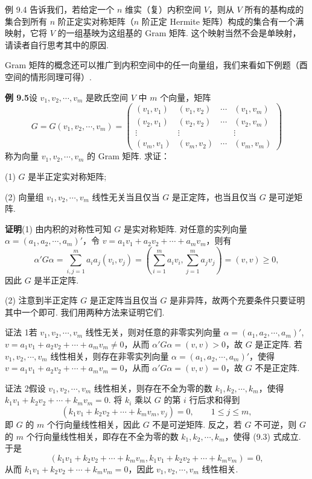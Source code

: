 \documentclass[UTF8,12pt,a4paper,fontset=fandol]{ctexart}
\begin{document}
例 9.4 告诉我们，若给定一个 $n$ 维实（复）内积空间 $V$，则从 $V$ 所有的基构成的集合到所有 $n$ 阶正定实对称矩阵（$n$ 阶正定 Hermite 矩阵）构成的集合有一个满映射，它将 $V$ 的一组基映为这组基的 Gram 矩阵. 这个映射当然不会是单映射，请读者自行思考其中的原因.

Gram 矩阵的概念还可以推广到内积空间中的任一向量组，我们来看如下例题（酉空间的情形同理可得）.

\noindent\textbf{例 9.5}\quad 设 $v_1,v_2,\cdots,v_m$ 是欧氏空间 $V$ 中 $m$ 个向量，矩阵
\[
G=G(v_1,v_2,\cdots,v_m)=
\begin{pmatrix}
(v_1,v_1)&(v_1,v_2)&\cdots&(v_1,v_m)\\
(v_2,v_1)&(v_2,v_2)&\cdots&(v_2,v_m)\\
\vdots&\vdots&&\vdots\\
(v_m,v_1)&(v_m,v_2)&\cdots&(v_m,v_m)
\end{pmatrix}
\]
称为向量 $v_1,v_2,\cdots,v_m$ 的 Gram 矩阵. 求证：

(1) $G$ 是半正定实对称矩阵;

(2) 向量组 $v_1,v_2,\cdots,v_m$ 线性无关当且仅当 $G$ 是正定阵，也当且仅当 $G$ 是可逆矩阵.

\noindent\textbf{证明}\quad (1) 由内积的对称性可知 $G$ 是实对称矩阵. 对任意的实列向量 $\alpha=(a_1,a_2,\cdots,a_m)'$，令 $v=a_1v_1+a_2v_2+\cdots+a_mv_m$，则有
\[
\alpha'G\alpha=\sum_{i,j=1}^m a_ia_j(v_i,v_j)
=\left(\sum_{i=1}^m a_iv_i,\sum_{j=1}^m a_jv_j\right)
=(v,v)\ge 0,
\]
因此 $G$ 是半正定阵.

(2) 注意到半正定阵 $G$ 是正定阵当且仅当 $G$ 是非异阵，故两个充要条件只要证明其中一个即可. 我们用两种方法来证明它们.

证法 1\quad 若 $v_1,v_2,\cdots,v_m$ 线性无关，则对任意的非零实列向量 $\alpha=(a_1,a_2,\cdots,a_m)'$, $v=a_1v_1+a_2v_2+\cdots+a_mv_m\ne 0$，从而 $\alpha'G\alpha=(v,v)>0$，故 $G$ 是正定阵. 若 $v_1,v_2,\cdots,v_m$ 线性相关，则存在非零实列向量 $\alpha=(a_1,a_2,\cdots,a_m)'$，使得 $v=a_1v_1+a_2v_2+\cdots+a_mv_m=0$，从而 $\alpha'G\alpha=(v,v)=0$，故 $G$ 不是正定阵.

证法 2\quad 假设 $v_1,v_2,\cdots,v_m$ 线性相关，则存在不全为零的数 $k_1,k_2,\cdots,k_m$，使得 $k_1v_1+k_2v_2+\cdots+k_mv_m=0$. 将 $k_i$ 乘以 $G$ 的第 $i$ 行后求和得到
\begin{equation}
(k_1v_1+k_2v_2+\cdots+k_mv_m,v_j)=0,\qquad 1\le j\le m,
\tag{9.3}
\end{equation}
即 $G$ 的 $m$ 个行向量线性相关，因此 $G$ 不是可逆矩阵. 反之，若 $G$ 不可逆，则 $G$ 的 $m$ 个行向量线性相关，即存在不全为零的数 $k_1,k_2,\cdots,k_m$，使得 (9.3) 式成立. 于是
\[
(k_1v_1+k_2v_2+\cdots+k_mv_m,k_1v_1+k_2v_2+\cdots+k_mv_m)=0,
\]
从而 $k_1v_1+k_2v_2+\cdots+k_mv_m=0$，因此 $v_1,v_2,\cdots,v_m$ 线性相关.
\end{document}
